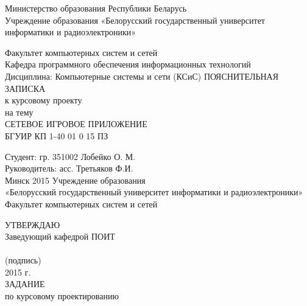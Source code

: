 \documentclass[14pt,a4paper]{extreport}
\title{}
\author{}
\begin{document}
	\center
	Министерство образования Республики Беларусь\\
	Учреждение образования «Белорусский государственный университет информатики и радиоэлектроники»
	\vspace*{2cm}
	\endcenter
	\raggedright
	Факультет компьютерных систем и сетей\\
	\medskip
	Кафедра программного обеспечения информационных технологий\\
	\medskip
	Дисциплина:  Компьютерные системы и сети (КСиС)
	\vspace*{2cm}
	\center
	ПОЯСНИТЕЛЬНАЯ ЗАПИСКА\\
	к курсовому проекту\\
	на тему\\
	\medskip
	СЕТЕВОЕ ИГРОВОЕ ПРИЛОЖЕНИЕ \\
	\medskip
	БГУИР КП  1-40 01 0 15 ПЗ
	\vspace*{4cm}
	\endcenter
	\raggedright
	\hspace*{7.94cm}Студент:  гр. 351002 Лобейко О. М.\\
	\bigskip
	\hspace*{7.94cm}Руководитель: асс. Третьяков Ф.И.\\
	\center
	\vspace*{2cm}
	Минск 2015
	\pagestyle{empty}
	\newpage
	\center
	Учреждение образования\\
	\medskip
	«Белорусский государственный университет информатики и радиоэлектроники»\\
	\medskip
	Факультет компьютерных систем и сетей\\
	\medskip
	\endcenter
	\raggedright
	\hspace*{9.53cm}УТВЕРЖДАЮ\\
	\hspace*{9.53cm}Заведующий кафедрой ПОИТ\\
	\hspace*{9.53cm}\underline{\hspace{6cm}} \\
	\hspace*{11cm}\small (подпись) \normalsize\\
	\hspace*{9.53cm}\underline{\hspace{5cm}}2015 г.\\
	\medskip
	\center
	ЗАДАНИЕ\\
	по курсовому проектированию\\
	\medskip
\end{document}
